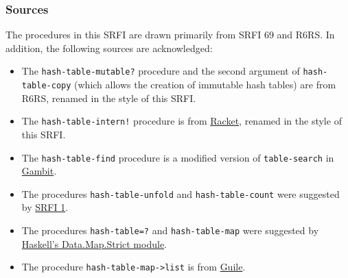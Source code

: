 \subsubsection{Sources}\label{Sources}

The procedures in this SRFI are drawn primarily from SRFI 69 and R6RS.
In addition, the following sources are acknowledged:

\begin{itemize}
\tightlist
\item
  The \texttt{hash-table-mutable?} procedure and the second argument of
  \texttt{hash-table-copy} (which allows the creation of immutable hash
  tables) are from R6RS, renamed in the style of this SRFI.
\end{itemize}

\begin{itemize}
\tightlist
\item
  The \texttt{hash-table-intern!} procedure is from
  \href{http://docs.racket-lang.org/reference/hashtables.html}{Racket},
  renamed in the style of this SRFI.
\end{itemize}

\begin{itemize}
\tightlist
\item
  The \texttt{hash-table-find} procedure is a modified version of
  \texttt{table-search} in
  \href{http://www.iro.umontreal.ca/~gambit/doc/gambit-c.html\#Tables}{Gambit}.
\end{itemize}

\begin{itemize}
\tightlist
\item
  The procedures \texttt{hash-table-unfold} and
  \texttt{hash-table-count} were suggested by
  \href{http://srfi.schemers.org/srfi-1/srfi-1.html}{SRFI 1}.
\end{itemize}

\begin{itemize}
\tightlist
\item
  The procedures \texttt{hash-table=?} and \texttt{hash-table-map} were
  suggested by
  \href{http://hackage.haskell.org/packages/archive/containers/0.5.2.1/doc/html/Data-Map-Strict.html}{Haskell's
  Data.Map.Strict module}.
\end{itemize}

\begin{itemize}
\tightlist
\item
  The procedure \texttt{hash-table-map-\textgreater{}list} is from
  \href{http://www.gnu.org/software/guile/manual/html_node/Hash-Table-Reference.html}{Guile}.
\end{itemize}

